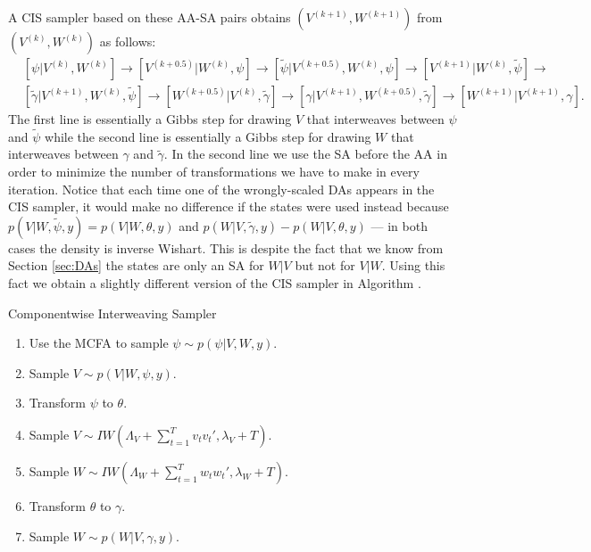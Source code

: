 \documentclass[12pt]{article}
\begin{document}
A CIS sampler based on these AA-SA pairs obtains $(V^{(k+1)},W^{(k+1)})$ from $(V^{(k)},W^{(k)})$ as follows:
\begin{align*}
&[\psi|V^{(k)},W^{(k)}] \to [V^{(k+0.5)}|W^{(k)},\psi] \to [\tilde{\psi}|V^{(k+0.5)},W^{(k)},\psi] \to [V^{(k+1)}|W^{(k)},\tilde{\psi}]\to\\
&[\tilde{\gamma}|V^{(k+1)},W^{(k)},\tilde{\psi}] \to [W^{(k+0.5)}|V^{(k)},\tilde{\gamma}] \to [\gamma|V^{(k+1)},W^{(k+0.5)},\tilde{\gamma}]\to [W^{(k+1)}|V^{(k+1)},\gamma].
\end{align*}
The first line is essentially a Gibbs step for drawing $V$ that interweaves between $\psi$ and $\tilde{\psi}$ while the second line is essentially a Gibbs step for drawing $W$ that interweaves between $\gamma$ and $\tilde{\gamma}$. In the second line we use the SA before the AA in order to minimize the number of transformations we have to make in every iteration. Notice that each time one of the wrongly-scaled DAs appears in the CIS sampler, it would make no difference if the states were used instead because $p(V|W,\tilde{\psi},y)=p(V|W,\theta,y)$ and $p(W|V,\tilde{\gamma},y)-p(W|V,\theta,y)$ --- in both cases the density is inverse Wishart. This is despite the fact that we know from Section \ref{sec:DAs} the states are only an SA for $W|V$ but not for $V|W$. Using this fact we obtain a slightly different version of the CIS sampler in Algorithm .
\begin{alg*}[CIS]Componentwise Interweaving Sampler\label{alg:DLMcis}
\begin{enumerate}
\item Use the MCFA to sample $\psi \sim p(\psi|V,W,y)$.
\item Sample $V \sim p(V|W,\psi,y)$.
\item Transform $\psi$ to $\theta$.
\item Sample $V \sim IW\left(\Lambda_V + \sum_{t=1}^Tv_tv_t',\lambda_V + T\right)$.
\item Sample $W \sim IW\left(\Lambda_W + \sum_{t=1}^Tw_tw_t',\lambda_{W} + T\right)$.
\item Transform $\theta$ to $\gamma$.
\item Sample $W \sim p(W|V,\gamma,y)$.
\end{enumerate}
\end{alg*}
\end{document}
